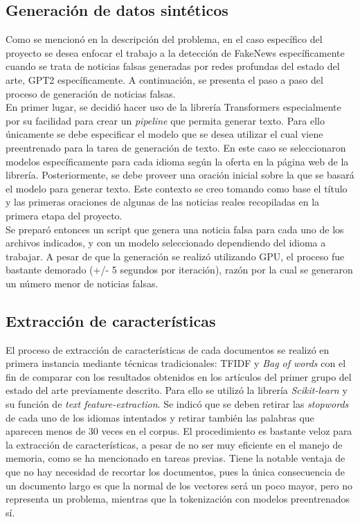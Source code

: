 \subsection{Generación de datos sintéticos}
Como se mencionó en la descripción del problema, en el caso específico del proyecto se desea enfocar el trabajo a la detección de FakeNews específicamente cuando se trata de noticias falsas generadas por redes profundas del estado del arte, GPT2 específicamente. A continuación, se presenta el paso a paso del proceso de generación de noticias falsas.\\

En primer lugar, se decidió hacer uso de la librería Transformers especialmente por su facilidad para crear un \textit{pipeline} que permita generar texto. Para ello únicamente se debe especificar el modelo que se desea utilizar el cual viene preentrenado para la tarea de generación de texto. En este caso se seleccionaron modelos específicamente para cada idioma según la oferta en la página web de la librería. Posteriormente, se debe proveer una oración inicial sobre la que se basará el modelo para generar texto. Este contexto se creo tomando como base el título y las primeras oraciones de algunas de las noticias reales recopiladas en la primera etapa del proyecto. \\

Se preparó entonces un script que genera una noticia falsa para cada uno de los archivos indicados, y con un modelo seleccionado dependiendo del idioma a trabajar. A pesar de que la generación se realizó utilizando GPU, el proceso fue bastante demorado (+/- 5 segundos por iteración), razón por la cual se generaron un número menor de noticias falsas.

\subsection{Extracción de características}
El proceso de extracción de características de cada documentos se realizó en primera instancia mediante técnicas tradicionales: TFIDF y \textit{Bag of words} con el fin de comparar con los resultados obtenidos en los artículos del primer grupo del estado del arte previamente descrito. Para ello se utilizó la librería \textit{Scikit-learn} y su función de \textit{text feature-extraction}. Se indicó que se deben retirar las \textit{stopwords} de cada uno de los idiomas intentados y retirar también las palabras que aparecen menos de 30 veces en el corpus. El procedimiento es bastante veloz para la extracción de características, a pesar de no ser muy eficiente en el manejo de memoria, como se ha mencionado en tareas previas. Tiene la notable ventaja de que no hay necesidad de recortar los documentos, pues la única consecuencia de un documento largo es que la normal de los vectores será un poco mayor,  pero no representa un problema, mientras que la tokenización con modelos preentrenados sí.\\

